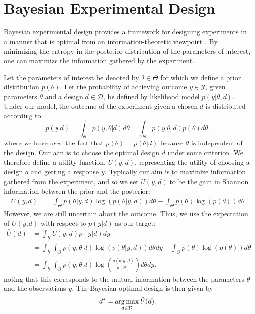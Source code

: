 
\section{Bayesian Experimental Design}
\label{sec:exp-design}

Bayesian experimental design provides a framework for designing experiments in a manner that is optimal from
an information-theoretic viewpoint \citep{chaloner1995bayesian,sebastiani2000maximum}.  By minimizing the entropy in the posterior distribution of the 
parameters of interest, one can maximize the information gathered by the experiment.

Let the parameters of interest be denoted by $\theta \in \Theta$ for which we define a prior distribution $p(\theta)$.
Let the probability of achieving outcome $y\in\mathcal{Y}$, given parameters $\theta$ 
and a design $d \in \mathcal{D}$, be defined by likelihood model $p(y | \theta, d)$.
Under our model, the outcome of the experiment given a chosen $d$ is distributed according to
\begin{equation}
\label{eq:marginal_def}
p(y | d) = \int_{\Theta} p(y,\theta | d) d\theta = \int_{\Theta} p(y | \theta, d) p(\theta) d\theta.
\end{equation}
where we have used the fact that $p(\theta)=p(\theta|d)$ because $\theta$ is independent of the design.
Our aim is to choose the optimal design $d$ under some criterion. 
We therefore define a utility function, $U(y,d)$, representing the utility of choosing a design $d$ 
and getting a response $y$.
Typically our aim is to maximize information gathered from the experiment, and so we set 
$U(y,d)$ to be the gain in Shannon information between the prior and the posterior:
\begin{align}
\label{eq:shannon_inf}
U(y,d) &= \int_{\Theta} p(\theta |y, d) \log(p(\theta |y, d)) d\theta -\int_{\Theta} p(\theta) \log(p(\theta))d\theta
\end{align}
However, we are still uncertain about the outcome. Thus, we use the expectation of $U(y,d)$ with respect to $p(y | d)$
as our target:
\begin{align}
\bar{U}(d) & = \int_{\mathcal{Y}} U(y,d) p(y|d) dy\nonumber\\
&=\int_{\mathcal{Y}}\int_{\Theta} p(y,\theta | d)\log(p(\theta |y, d)) d\theta dy - \int_{\Theta} p(\theta) \log(p(\theta)) d\theta \nonumber\\
&=\int_{\mathcal{Y}}\int_{\Theta} p(y,\theta | d)\log\left(\frac{p(\theta |y, d)}{p(\theta)}\right)d\theta dy. 
\label{eq:u_bar_1}
\end{align}
noting that this corresponds to the mutual information between the parameters $\theta$ and
the observations $y$.  The Bayesian-optimal design is then given by
\begin{equation}
\label{eq:d_star}
d^* = \operatorname*{arg\,max}_{d \in \mathcal{D}} \bar{U}(d).
\end{equation}

